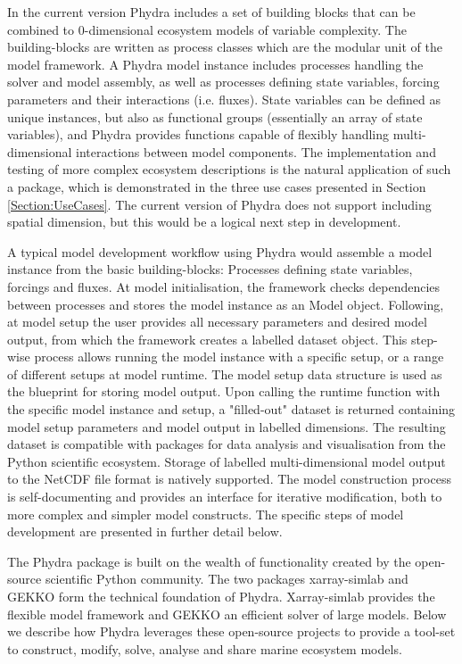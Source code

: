 \documentclass[journal abbreviations, manuscript]{copernicus}
\begin{document}
In the current version Phydra includes a set of building blocks that can be combined to 0-dimensional ecosystem models of variable complexity. The building-blocks are written as process classes which are the modular unit of the model framework. A Phydra model instance includes processes handling the solver and model assembly, as well as processes defining state variables, forcing parameters and their interactions (i.e. fluxes). State variables can be defined as unique instances, but also as functional groups (essentially an array of state variables), and Phydra provides functions capable of flexibly handling multi-dimensional interactions between model components. The implementation and testing of more complex ecosystem descriptions is the natural application of such a package, which is demonstrated in the three use cases presented in Section \ref{Section:UseCases}. The current version of Phydra does not support including spatial dimension, but this would be a logical next step in development.

A typical model development workflow using Phydra would assemble a model instance from the basic building-blocks: Processes defining state variables, forcings and fluxes. At model initialisation, the framework checks dependencies between processes and stores the model instance as an Model object. Following, at model setup the user provides all necessary parameters and desired model output, from which the framework creates a labelled dataset object. This step-wise process allows running the model instance with a specific setup, or a range of different setups at model runtime. The model setup data structure is used as the blueprint for storing model output. Upon calling the runtime function with the specific model instance and setup, a "filled-out" dataset is returned containing model setup parameters and model output in labelled dimensions. The resulting dataset is compatible with packages for data analysis and visualisation from the Python scientific ecosystem. Storage of labelled multi-dimensional model output to the NetCDF file format is natively supported.
The model construction process is self-documenting and provides an interface for iterative modification, both to more complex and simpler model constructs. The specific steps of model development are presented in further detail below.

The Phydra package is built on the wealth of functionality created by the open-source scientific Python community. The two packages xarray-simlab and GEKKO form the technical foundation of Phydra. Xarray-simlab provides the flexible model framework and GEKKO an efficient solver of large models. Below we describe how Phydra leverages these open-source projects to provide a tool-set to construct, modify, solve, analyse and share marine ecosystem models. 
\end{document}
